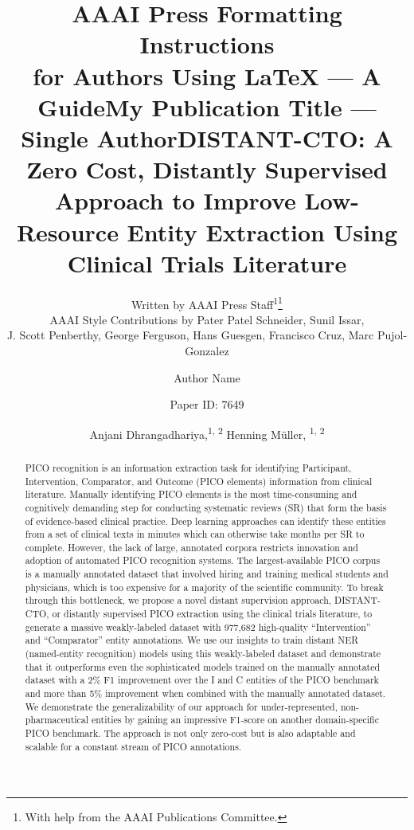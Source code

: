 \documentclass[letterpaper]{article} %
\title{AAAI Press Formatting Instructions \\for Authors Using \LaTeX{} --- A Guide}
\author{
    Written by AAAI Press Staff\textsuperscript{\rm 1}\thanks{With help from the AAAI Publications Committee.}\\
    AAAI Style Contributions by Pater Patel Schneider,
    Sunil Issar,\\
    J. Scott Penberthy,
    George Ferguson,
    Hans Guesgen,
    Francisco Cruz\equalcontrib,
    Marc Pujol-Gonzalez\equalcontrib
}
\title{My Publication Title --- Single Author}
\author {
    Author Name
}
\title{DISTANT-CTO: A Zero Cost, Distantly Supervised Approach to Improve Low-Resource Entity Extraction Using Clinical Trials Literature}
\author {
    Paper ID: 7649
}
\author {
    Anjani Dhrangadhariya,\textsuperscript{\rm 1, 2}
    Henning M\"uller, \textsuperscript{\rm 1, 2}
}
\begin{document}
\maketitle

\begin{abstract}
PICO recognition is an information extraction task for identifying Participant, Intervention, Comparator, and Outcome (PICO elements) information from clinical literature.
Manually identifying PICO elements is the most time-consuming and cognitively demanding step for conducting systematic reviews (SR) that form the basis of evidence-based clinical practice. Deep learning approaches can identify these entities from a set of clinical texts in minutes which can otherwise take months per SR to complete.
However, the lack of large, annotated corpora restricts innovation and adoption of automated PICO recognition systems.
The largest-available PICO corpus is a manually annotated dataset that involved hiring and training medical students and physicians, which is too expensive for a majority of the scientific community.
To break through this bottleneck, we propose a novel distant supervision approach, DISTANT-CTO, or distantly supervised PICO extraction using the clinical trials literature, to generate a massive weakly-labeled dataset with 977,682 high-quality ``Intervention'' and ``Comparator'' entity annotations.
We use our insights to train distant NER (named-entity recognition) models using this weakly-labeled dataset and demonstrate that it outperforms even the sophisticated models trained on the manually annotated dataset with a 2\% F1 improvement over the I and C entities of the PICO benchmark and more than 5\% improvement when combined with the manually annotated dataset.
We demonstrate the generalizability of our approach for under-represented, non-pharmaceutical entities by gaining an impressive F1-score on another domain-specific PICO benchmark.
The approach is not only zero-cost but is also adaptable and scalable for a constant stream of PICO annotations.
\end{abstract}
%
\end{document}
